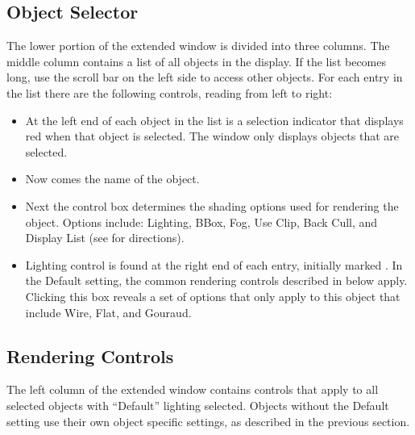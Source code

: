 \subsection{Object Selector}

The lower portion of the extended \viewer{} window is divided into three
columns. The middle column contains a list of all objects in the
display.  If the list becomes long, use the scroll bar on the left
side to access other objects.  For each entry in the list there are
the following controls, reading from left to right:

\begin{itemize}
  \item At the left end of each object
        in the list is a selection indicator that displays red
        when that object is 
        selected.  The \viewer{} window only displays objects that
        are selected.
  \item Now comes the name of the object.
  \item Next the  control box determines the
        shading options used for rendering the object.
        Options include: Lighting, BBox, Fog, Use Clip, Back Cull, and
        Display List  (see
         for directions).
  \item Lighting control is found at the right end of each entry, initially
        marked .  In the Default setting, the common
        rendering controls described in  below apply.  Clicking this box
        reveals a set of options that only apply to this object that
        include Wire, Flat, and Gouraud.
\end{itemize}


\subsection{Rendering Controls}
\label{sec:view-rendering} 

The left column of the extended \viewer{} window contains controls that
apply to all selected objects with ``Default'' lighting selected.
Objects without the Default setting use their own object specific
settings, as described in the previous section.  


